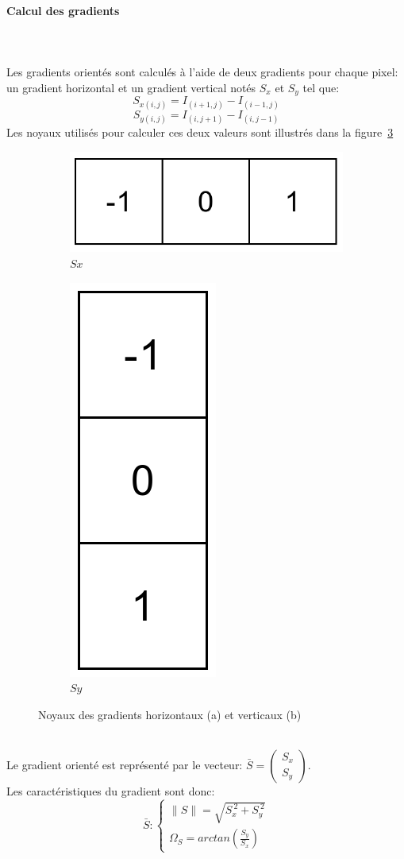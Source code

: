 \documentclass[12pt]{article}
\begin{document}
\paragraph{Calcul des gradients}~\\
\\
Les gradients orientés sont calculés à l'aide de deux gradients pour chaque pixel: un gradient horizontal et un gradient vertical notés $S_{x}$ et $S_{y}$ tel que:
\[S_{x(i,j)}=I_{(i+1,j)}-I_{(i-1,j)}\]
\[S_{y(i,j)}=I_{(i,j+1)}-I_{(i,j-1)}\]
Les noyaux utilisés pour calculer ces deux valeurs sont illustrés dans la figure~\ref{fig:kernels}
\begin{figure}[!ht]
\centering
\begin{subfigure}{.3\textwidth}
  \centering
  \includegraphics[width=.45\linewidth]{img/Sx.png}
  \caption{$Sx$}
  \label{fig:kernel_sx}
\end{subfigure}
\begin{subfigure}{.3\textwidth}
  \centering
  \includegraphics[width=.15\linewidth]{img/Sy.png}
  \caption{$Sy$}
  \label{fig:kernel_sy}
\end{subfigure}
\caption{Noyaux des gradients horizontaux (a) et verticaux (b)}
\label{fig:kernels}
\end{figure}
\\
Le gradient orienté est représenté par le vecteur: $\bar{S}=\begin{pmatrix}S_{x}\\S_{y}\end{pmatrix}$.\\
Les caractéristiques du gradient sont donc:
\[\bar{S}:\begin{cases}
\|S\|=\sqrt{S_{x}^{~2}+S_{y}^{~2}}\\
\Omega_{S} = arctan(\frac{S_{y}}{S_{x}})
\end{cases}\]
\end{document}

